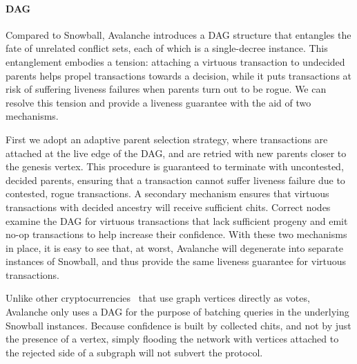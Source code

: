 \documentclass[letterpaper,twocolumn,10pt]{article}
\theoremstyle{definition}
\begin{document}

\paragraph{DAG} Compared to Snowball, Avalanche introduces a DAG structure that entangles the fate of unrelated conflict sets, each of which is a single-decree instance.
This entanglement embodies a tension: attaching a virtuous transaction to undecided parents helps propel transactions towards a decision, while it puts transactions at risk of suffering liveness failures when parents turn out to be rogue.
We can resolve this tension and provide a liveness guarantee with the aid of two mechanisms.

First we adopt an adaptive parent selection strategy, where transactions are attached at the live edge of the DAG, and are retried with new parents closer to the genesis vertex. This procedure is guaranteed to terminate with uncontested, decided parents, ensuring that a transaction cannot suffer liveness failure due to contested, rogue transactions.
A secondary mechanism ensures that virtuous transactions with decided ancestry will receive sufficient chits. Correct nodes examine the DAG for virtuous transactions that lack sufficient progeny and emit no-op transactions to help increase their confidence.
With these two mechanisms in place, it is easy to see that, at worst, Avalanche will degenerate into separate instances of Snowball, and thus provide the same liveness guarantee for virtuous transactions.

Unlike other cryptocurrencies~\cite{IOTA} that use graph vertices
directly as votes, Avalanche only uses a DAG for the purpose of batching queries
in the underlying Snowball instances.
Because confidence is built by collected chits, and not by just the presence of
a vertex, simply flooding the network with vertices attached to the rejected
side of a subgraph will not subvert the protocol.
\end{document}
